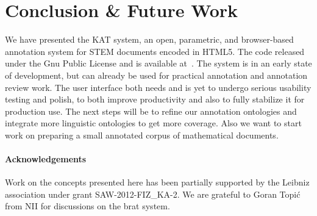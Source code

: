\documentclass{llncs}
\def\KAT{\textsf{KAT}\xspace}
\begin{document}
\section{Conclusion \& Future Work}\label{sec:concl}

We have presented the \KAT system, an open, parametric, and browser-based annotation
system for STEM documents encoded in HTML5.  The code released under the Gnu Public
License and is available at~\cite{KAT:github:on}. The system is in an early state of
development, but can already be used for practical annotation and annotation review work.
The user interface both needs and is yet to undergo serious usability testing and polish,
to both improve productivity and also to fully stabilize it for production use.
The next steps will be to refine our annotation ontologies and integrate more linguistic
ontologies to get more coverage. Also we want to start work on preparing a 
small annotated corpus of mathematical documents. 

\paragraph{Acknowledgements} Work on the concepts presented here has been partially
supported by the Leibniz association under grant SAW-2012-FIZ\_KA-2. We are grateful to
Goran Topi\'c from NII for discussions on the brat system.

\printbibliography
\end{document}
